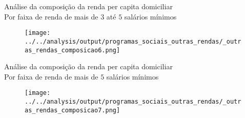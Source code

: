 \begin{frame}[label=_outras_rendas_composicao6]{{\small Análise da composição da renda per capita domiciliar \\  Por faixa de renda de mais de $3$ até $5$ salários mínimos}}
\textit{\hyperlink{_outras_rendas_composicao}{}}
\begin{figure}
  \centering
  \texttt{[image: ../../analysis/output/programas\_sociais\_outras\_rendas/\_outras\_rendas\_composicao6.png]}
  \caption{}
  \label{fig:_outras_rendas_composicao6}
\end{figure}
\end{frame}

\begin{frame}[label=_outras_rendas_composicao7]{{\small Análise da composição da renda per capita domiciliar \\  Por faixa de renda de mais de $5$ salários mínimos}}
\textit{\hyperlink{_outras_rendas_composicao}{}}
\begin{figure}
  \centering
  \texttt{[image: ../../analysis/output/programas\_sociais\_outras\_rendas/\_outras\_rendas\_composicao7.png]}
  \caption{}
  \label{fig:_outras_rendas_composicao7}
\end{figure}
\end{frame}

